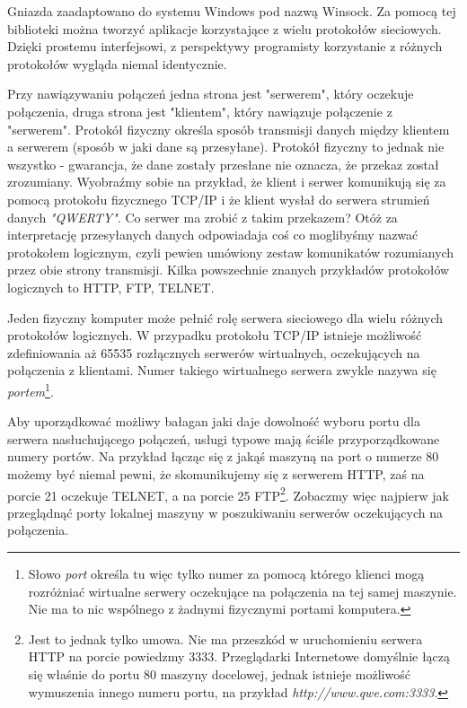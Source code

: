 Gniazda zaadaptowano do systemu Windows pod nazwą Winsock. 
Za pomocą tej biblioteki można tworzyć aplikacje korzystające z wielu protokołów sieciowych. 
Dzięki prostemu interfejsowi, z perspektywy programisty korzystanie z różnych 
protokołów wygląda niemal identycznie. 

Przy nawiązywaniu połączeń jedna strona jest "serwerem", który oczekuje połączenia, 
druga strona jest "klientem", który nawiązuje połączenie z "serwerem". Protokół fizyczny określa
sposób transmisji danych między klientem a serwerem (sposób w jaki dane
są przesyłane). Protokół fizyczny to jednak nie wszystko - gwarancja, że dane zostały przesłane nie
oznacza, że przekaz został zrozumiany. Wyobraźmy sobie na przykład, że klient i serwer 
komunikują się za pomocą protokołu fizycznego
TCP/IP i że klient wysłał do serwera strumień danych {\em "QWERTY"}. Co serwer ma zrobić z takim przekazem?
Otóż za interpretację przesyłanych danych odpowiadaja coś co moglibyśmy nazwać protokołem logicznym, 
czyli pewien umówiony zestaw komunikatów rozumianych przez obie strony transmisji. Kilka powszechnie
znanych przykładów protokołów logicznych to HTTP, FTP, TELNET.

Jeden fizyczny komputer może pełnić rolę serwera sieciowego dla wielu różnych protokołów logicznych.
W przypadku protokołu TCP/IP istnieje możliwość zdefiniowania aż 65535 rozłącznych serwerów wirtualnych,
oczekujących na połączenia z klientami. Numer takiego wirtualnego serwera zwykle nazywa się 
{\em portem}\footnote{Słowo {\em port} określa tu więc tylko numer za pomocą którego klienci mogą rozróżniać 
wirtualne serwery oczekujące na połączenia na tej samej maszynie. Nie ma to nic wspólnego z żadnymi
fizycznymi portami komputera.}.

Aby uporządkować możliwy bałagan jaki daje dowolność wyboru portu dla serwera nasłuchującego połączeń, usługi
typowe mają ściśle przyporządkowane numery portów. Na przykład łącząc się z jakąś maszyną na
port o numerze 80 możemy być niemal pewni, że skomunikujemy się z serwerem HTTP, zaś na porcie
21 oczekuje TELNET, a na porcie 25 FTP\footnote{Jest to jednak tylko umowa. Nie ma przeszkód w uruchomieniu
serwera HTTP na porcie powiedzmy 3333. Przeglądarki Internetowe domyślnie łączą się właśnie do portu
80 maszyny docelowej, jednak istnieje możliwość wymuszenia innego numeru portu, na przykład
{\em http://www.qwe.com:3333}.}. Zobaczmy więc najpierw jak przeglądnąć porty lokalnej maszyny
w poszukiwaniu serwerów oczekujących na połączenia.

